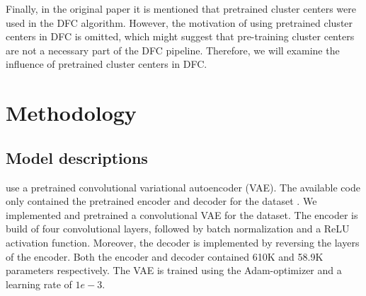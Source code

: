 Finally, in the original paper it is mentioned that pretrained cluster centers were used in the DFC algorithm. However, the motivation of using pretrained cluster centers in DFC is omitted, which might suggest that pre-training cluster centers are not a necessary part of the DFC pipeline. Therefore, we will examine the influence of pretrained cluster centers in DFC.



\section{Methodology}

\subsection{Model descriptions}
\citet{Li_2020_CVPR} use a pretrained convolutional variational autoencoder (VAE). The available code only contained the pretrained encoder and decoder for the \USPSMNIST dataset \citep{git}. We implemented and pretrained a convolutional VAE for the \revMNIST dataset. The encoder is build of four convolutional layers, followed by batch normalization and a ReLU activation function. Moreover, the decoder is implemented by reversing the layers of the encoder. Both the encoder and decoder contained 610K and 58.9K parameters respectively. The VAE is trained using the Adam-optimizer and a learning rate of $1e-3$. 

